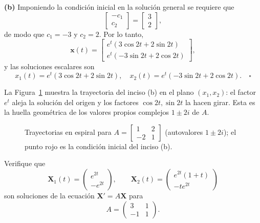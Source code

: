 \begin{example}
\textbf{(b)} Imponiendo la condici\'on inicial en la soluci\'on general se requiere que
\[
\begin{bmatrix} -c_1 \\ c_2 \end{bmatrix} = \begin{bmatrix} 3 \\ 2 \end{bmatrix},
\]
de modo que $c_1 = -3$ y $c_2 = 2$. Por lo tanto,
\[
\mathbf{x}(t) = \begin{bmatrix} e^t(3 \cos 2t + 2 \sin 2t) \\ e^t(-3 \sin 2t + 2 \cos 2t) \end{bmatrix},
\]
y las soluciones escalares son
\[
x_1(t) = e^t(3 \cos 2t + 2 \sin 2t), \quad x_2(t) = e^t(-3 \sin 2t + 2 \cos 2t). \quad \square
\]
\end{example}

La Figura~\ref{fig:espiral} muestra la trayectoria del inciso (b) en el plano $(x_1,x_2)$: el factor $e^t$ aleja la soluci\'on del origen y los factores $\cos 2t,\sin 2t$ la hacen girar. Esta es la huella geom\'etrica de los valores propios complejos $1\pm 2i$ de $A$.

\begin{figure}[H]
\centering
{}
\caption{Trayectorias en espiral para $A=\begin{bmatrix}1&2\\-2&1\end{bmatrix}$ (autovalores $1\pm2i$); el punto rojo es la condici\'on inicial del inciso (b).}
\label{fig:espiral}
\end{figure}

\begin{example}\label{ex:defectuosa}
Verifique que
\[
\mathbf X_1(t)=\begin{pmatrix} e^{2t}\\ -e^{2t} \end{pmatrix},\qquad
\mathbf X_2(t)=\begin{pmatrix} e^{2t}(1+t)\\ -te^{2t} \end{pmatrix}
\]
son soluciones de la ecuaci\'on $\mathbf X'=A\mathbf X$ para
\[
A=\begin{pmatrix} 3 & 1 \\ -1 & 1 \end{pmatrix}.
\]
\end{example}


